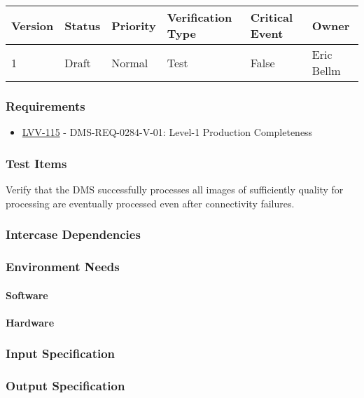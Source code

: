 \begin{longtable}[]{llllll}
\toprule
Version & Status & Priority & Verification Type & Critical Event & Owner
\\\midrule
1 & Draft & Normal &
Test & False & Eric Bellm
\\\bottomrule
\end{longtable}

\subsubsection{Requirements}
\begin{itemize}
\item \href{https://jira.lsstcorp.org/browse/LVV-115}{LVV-115} - DMS-REQ-0284-V-01: Level-1 Production Completeness
\end{itemize}

\subsubsection{Test Items}
Verify that the DMS successfully processes all images of sufficiently
quality for processing are eventually processed even after connectivity
failures.



\subsubsection{Intercase Dependencies}

\subsubsection{Environment Needs}

\paragraph{Software}

\paragraph{Hardware}

\subsubsection{Input Specification}

\subsubsection{Output Specification}

